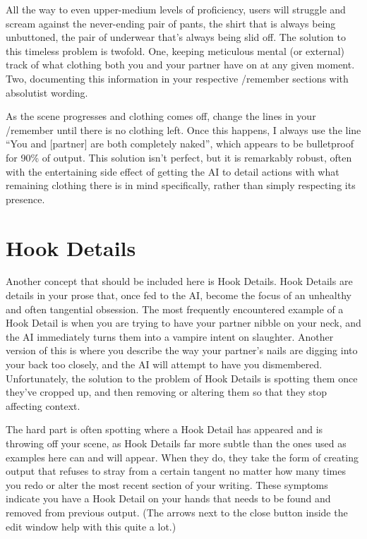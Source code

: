 \documentclass[Source-main.tex]{subfiles}
\begin{document}
All the way to even upper-medium levels of proficiency, users will struggle and scream against the never-ending pair of pants, the shirt that is always being unbuttoned, the pair of underwear that’s always being slid off.
The solution to this timeless problem is twofold.
One, keeping meticulous mental (or external) track of what clothing both you and your partner have on at any given moment.
Two, documenting this information in your respective /remember sections with absolutist wording.

As the scene progresses and clothing comes off, change the lines in your /remember until there is no clothing left.
Once this happens, I always use the line “You and [partner] are both completely naked”, which appears to be bulletproof for 90\% of output.
This solution isn’t perfect, but it is remarkably robust, often with the entertaining side effect of getting the AI to detail actions with what remaining clothing there is in mind specifically, rather than simply respecting its presence.

\section{Hook Details}

Another concept that should be included here is Hook Details.
Hook Details are details in your prose that, once fed to the AI, become the focus of an unhealthy and often tangential obsession.
The most frequently encountered example of a Hook Detail is when you are trying to have your partner nibble on your neck, and the AI immediately turns them into a vampire intent on slaughter.
Another version of this is where you describe the way your partner’s nails are digging into your back too closely, and the AI will attempt to have you dismembered.
Unfortunately, the solution to the problem of Hook Details is spotting them once they’ve cropped up, and then removing or altering them so that they stop affecting context.

The hard part is often spotting where a Hook Detail has appeared and is throwing off your scene, as Hook Details far more subtle than the ones used as examples here can and will appear.
When they do, they take the form of creating output that refuses to stray from a certain tangent no matter how many times you redo or alter the most recent section of your writing.
These symptoms indicate you have a Hook Detail on your hands that needs to be found and removed from previous output.
(The arrows next to the close button inside the edit window help with this quite a lot.)
\end{document}
